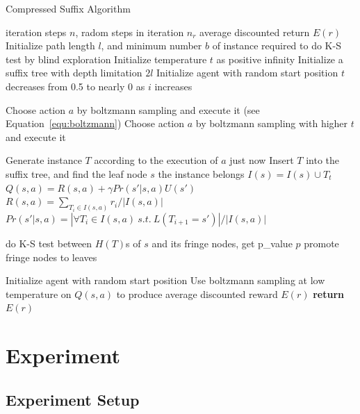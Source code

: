\documentclass{article}
\begin{document}
\begin{algorithm}
	\renewcommand{\algorithmicrequire}{\textbf{Input:}}
	\renewcommand{\algorithmicensure}{\textbf{Output:}}
	\caption{Compressed Suffix Algorithm}
	\label{alg:CSM}
	\begin{algorithmic}[1]
		\REQUIRE iteration steps $n$, radom steps in iteration $n_r$
		\ENSURE average discounted return $E(r)$
    \STATE Initialize path length $l$, and minimum number $b$ of instance required to do K-S test
    by blind exploration
    \STATE Initialize temperature $t$ as positive infinity
    \STATE Initialize a suffix tree with depth limitation $2l$
    \STATE Initialize agent with random start position
		    \STATE $t$ decreases from 0.5 to nearly 0 as $i$ increases
      \ENDIF

      \STATE Choose action $a$ by boltzmann sampling and execute it (see Equation~\ref{equ:boltzmann})
        \STATE Choose action $a$ by boltzmann sampling with higher $t$ and execute it
      \ENDWHILE

      \STATE Generate instance $T$ according to the execution of $a$ just now
      \STATE Insert $T$ into the suffix tree, and find the leaf node $s$ the instance belongs
      \STATE $I(s) = I(s) \cup {T_t}$
      \STATE $Q(s,a) = R(s,a) + \gamma Pr(s'|s,a)U(s')$
      \STATE $R(s,a) = {\sum_{T_i \in I(s,a)}r_i}/{|I(s,a)|}$
      \STATE $Pr(s'|s,a) = {|\forall{T_i \in I(s,a) \ s.t. \ L(T_{i+1} = s')}|} / {|I(s,a)|}$
      
        \STATE do K-S test between $H(T)$s of $s$ and its fringe nodes, get p\_value $p$ 
          \STATE promote fringe nodes to leaves
        \ENDIF
      \ENDIF

        \STATE Initialize agent with random start position
      \ENDIF
    \ENDFOR
    \STATE Use boltzmann sampling at low temperature on $Q(s, a)$ to produce average
    discounted reward $E(r)$
		\STATE \textbf{return} $E(r)$
	\end{algorithmic}  
\end{algorithm}

\section{Experiment}

\subsection{Experiment Setup}
\end{document}
